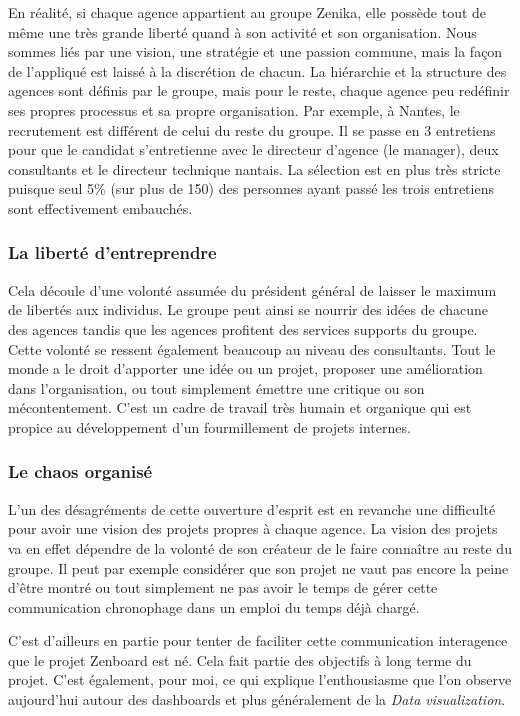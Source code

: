 En réalité, si chaque agence appartient au groupe Zenika, elle possède tout de même une très grande liberté quand à son activité et son organisation. Nous sommes liés par une vision, une stratégie et une passion commune, mais la façon de l'appliqué est laissé à la discrétion de chacun. La hiérarchie et la structure des agences sont définis par le groupe, mais pour le reste, chaque agence peu redéfinir ses propres processus et sa propre organisation. Par exemple, à Nantes, le recrutement est différent de celui du reste du groupe. Il se passe en 3 entretiens pour que le candidat s'entretienne avec le directeur d'agence (le manager), deux consultants et le directeur technique nantais. La sélection est en plus très stricte puisque seul 5\% (sur plus de 150) des personnes ayant passé les trois entretiens sont effectivement embauchés.

\subsubsection{La liberté d'entreprendre}

Cela découle d'une volonté assumée du président général de laisser le maximum de libertés aux individus. Le groupe peut ainsi se nourrir des idées de chacune des agences tandis que les agences profitent des services supports du groupe. Cette volonté se ressent également beaucoup au niveau des consultants. Tout le monde a le droit d'apporter une idée ou un projet, proposer une amélioration dans l'organisation, ou tout simplement émettre une critique ou son mécontentement. C'est un cadre de travail très humain et organique qui est propice au développement d'un fourmillement de projets internes.

\subsubsection{Le chaos organisé}

L'un des désagréments de cette ouverture d'esprit est en revanche une difficulté pour avoir une vision des projets propres à chaque agence. La vision des projets va en effet dépendre de la volonté de son créateur de le faire connaître au reste du groupe. Il peut par exemple considérer que son projet ne vaut pas encore la peine d'être montré ou tout simplement ne pas avoir le temps de gérer cette communication chronophage dans un emploi du temps déjà chargé.

C'est d'ailleurs en partie pour tenter de faciliter cette communication interagence que le projet Zenboard est né. Cela fait partie des objectifs à long terme du projet. C'est également, pour moi, ce qui explique l’enthousiasme que l'on observe aujourd'hui autour des dashboards et plus généralement de la \textit{Data visualization}. 

